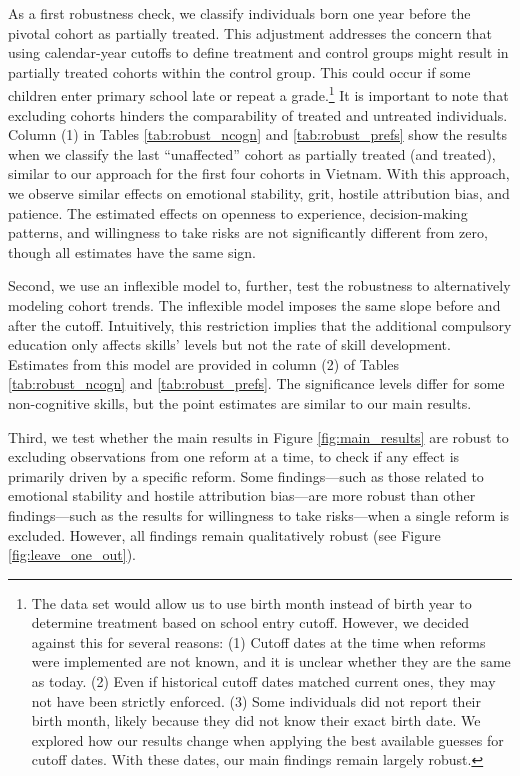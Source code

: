 As a first robustness check, we classify individuals born one year before the pivotal cohort as partially treated. This adjustment addresses the concern that using calendar-year cutoffs to define treatment and control groups might result in partially treated cohorts within the control group. This could occur if some children enter primary school late or repeat a grade.\footnote{
	The data set would allow us to use birth month instead of birth year to determine treatment based on school entry cutoff. However, we decided against this for several reasons: (1) Cutoff dates at the time when reforms were implemented are not known, and it is unclear whether they are the same as today. (2) Even if historical cutoff dates matched current ones, they may not have been strictly enforced. (3) Some individuals did not report their birth month, likely because they did not know their exact birth date. We explored how our results change when applying the best available guesses for cutoff dates. With these dates, our main findings remain largely robust.
}
It is important to note that excluding cohorts hinders the comparability of treated and untreated individuals. Column (1) in Tables \ref{tab:robust_ncogn} and \ref{tab:robust_prefs} show the results when we classify the last ``unaffected'' cohort as partially treated (and treated), similar to our approach for the first four cohorts in Vietnam. With this approach, we observe similar effects on emotional stability, grit, hostile attribution bias, and patience. The estimated effects on openness to experience, decision-making patterns, and willingness to take risks are not significantly different from zero, though all estimates have the same sign.

Second, we use an inflexible model to, further, test the robustness to alternatively modeling cohort trends. The inflexible model imposes the same slope before and after the cutoff. Intuitively, this restriction implies that the additional compulsory education only affects skills' levels but not the rate of skill development. Estimates from this model are provided in column (2) of Tables \ref{tab:robust_ncogn} and \ref{tab:robust_prefs}. The significance levels differ for some non-cognitive skills, but the point estimates are similar to our main results.

Third, we test whether the main results in Figure \ref{fig:main_results} are robust to excluding observations from one reform at a time, to check if any effect is primarily driven by a specific reform. Some findings---such as those related to emotional stability and hostile attribution bias---are more robust than other findings---such as the results for willingness to take risks---when a single reform is excluded. However, all findings remain qualitatively robust (see Figure \ref{fig:leave_one_out}).


